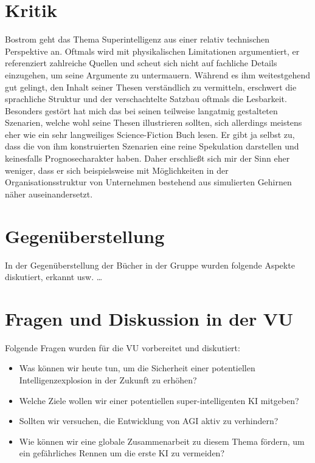 \documentclass[twoside, a4paper, DIV=11, open=any, bibliography=totoc]{scrbook}
\begin{document}
\section{Kritik} \label{sec:litkritik}

Bostrom geht das Thema Superintelligenz aus einer relativ technischen Perspektive
an. Oftmals wird mit physikalischen Limitationen argumentiert, er referenziert
zahlreiche Quellen und scheut sich nicht auf fachliche Details einzugehen, um seine
Argumente zu untermauern. Während es ihm weitestgehend gut gelingt, den Inhalt seiner
Thesen verständlich zu vermitteln, erschwert die sprachliche Struktur und der
verschachtelte Satzbau oftmals die Lesbarkeit.
Besonders gestört hat mich das bei seinen teilweise
langatmig gestalteten Szenarien, welche wohl seine Thesen illustrieren sollten,
sich allerdings meistens eher wie ein sehr langweiliges Science-Fiction Buch lesen.
Er gibt ja selbst zu, dass die von ihm konstruierten Szenarien eine reine Spekulation
darstellen und keinesfalls Prognosecharakter haben. Daher erschließt sich mir
der Sinn eher weniger, dass er sich beispielsweise mit Möglichkeiten in der
Organisationsstruktur von Unternehmen bestehend aus simulierten Gehirnen näher auseinandersetzt.

\section{Gegenüberstellung} \label{sec:litgegenueber}

In der Gegenüberstellung der Bücher in der Gruppe wurden folgende Aspekte diskutiert, erkannt usw. \ldots

\section{Fragen und Diskussion in der VU} \label{sec:fragenvu}

Folgende Fragen wurden für die VU vorbereitet und diskutiert:

\begin{itemize}
  \item Was können wir heute tun, um die Sicherheit einer potentiellen Intelligenzexplosion
  in der Zukunft zu erhöhen?
  \item Welche Ziele wollen wir einer potentiellen super-intelligenten KI mitgeben?
  \item Sollten wir versuchen, die Entwicklung von AGI aktiv zu verhindern?
  \item Wie können wir eine globale Zusammenarbeit zu diesem Thema fördern,
  um ein gefährliches Rennen um die erste KI zu vermeiden?
\end{itemize}
\end{document}
